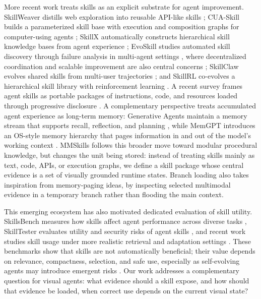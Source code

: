 More recent work treats skills as an explicit substrate for agent improvement. SkillWeaver distills web exploration into reusable API-like skills \citep{zheng2025skillweaver}; CUA-Skill builds a parameterized skill base with execution and composition graphs for computer-using agents \citep{chen2026cuaskill}; SkillX automatically constructs hierarchical skill knowledge bases from agent experience \citep{wang2026skillx}; EvoSkill studies automated skill discovery through failure analysis in multi-agent settings \citep{alzubi2026evoskill}, where decentralized coordination and scalable improvement are also central concerns \citep{yang2025agentnetdecentralizedevolutionarycoordination,shao2026monoscalescalingmultiagentmonotonic}; SkillClaw evolves shared skills from multi-user trajectories \citep{ma2026skillclawletskillsevolve}; and SkillRL co-evolves a hierarchical skill library with reinforcement learning \citep{xia2026skillrlevolvingagentsrecursive}. A recent survey frames agent skills as portable packages of instructions, code, and resources loaded through progressive disclosure \citep{xu2026agentskills}. A complementary perspective treats accumulated agent experience as long-term memory: Generative Agents maintain a memory stream that supports recall, reflection, and planning \citep{park2023generativeagentsinteractivesimulacra}, while MemGPT introduces an OS-style memory hierarchy that pages information in and out of the model's working context \citep{packer2024memgptllmsoperatingsystems}. MMSkills follows this broader move toward modular procedural knowledge, but changes the unit being stored: instead of treating skills mainly as text, code, APIs, or execution graphs, we define a skill package whose central evidence is a set of visually grounded runtime states. Branch loading also takes inspiration from memory-paging ideas, by inspecting selected multimodal evidence in a temporary branch rather than flooding the main context.

This emerging ecosystem has also motivated dedicated evaluation of skill utility. SkillsBench measures how skills affect agent performance across diverse tasks \citep{li2026skillsbenchbenchmarkingagentskills}, SkillTester evaluates utility and security risks of agent skills \citep{wang2026skilltesterbenchmarkingutilitysecurity}, and recent work studies skill usage under more realistic retrieval and adaptation settings \citep{liu2026agenticskillsworkwild}. These benchmarks show that skills are not automatically beneficial; their value depends on relevance, compactness, selection, and safe use, especially as self-evolving agents may introduce emergent risks \citep{shao2026agentmisevolveemergentrisks}. Our work addresses a complementary question for visual agents: what evidence should a skill expose, and how should that evidence be loaded, when correct use depends on the current visual state?

